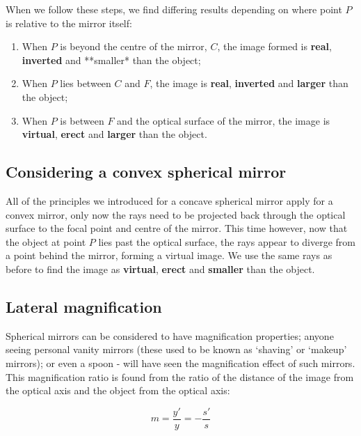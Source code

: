 \documentclass[
]{book}
\providecommand{\tightlist}{%
  \setlength{\itemsep}{0pt}\setlength{\parskip}{0pt}}
\begin{document}
When we follow these steps, we find differing results depending on where point \(P\) is relative to the mirror itself:

\begin{enumerate}
\def\labelenumi{\arabic{enumi}.}
\tightlist
\item
  When \(P\) is beyond the centre of the mirror, \(C\), the image formed is \textbf{real}, \textbf{inverted} and **smaller* than the object;
\item
  When \(P\) lies between \(C\) and \(F\), the image is \textbf{real}, \textbf{inverted} and \textbf{larger} than the object;
\item
  When \(P\) is between \(F\) and the optical surface of the mirror, the image is \textbf{virtual}, \textbf{erect} and \textbf{larger} than the object.
\end{enumerate}

\hypertarget{considering-a-convex-spherical-mirror}{%
\subsection{Considering a convex spherical mirror}\label{considering-a-convex-spherical-mirror}}

All of the principles we introduced for a concave spherical mirror apply for a convex mirror, only now the rays need to be projected back through the optical surface to the focal point and centre of the mirror. This time however, now that the object at point \(P\) lies past the optical surface, the rays appear to diverge from a point behind the mirror, forming a virtual image. We use the same rays as before to find the image as \textbf{virtual}, \textbf{erect} and \textbf{smaller} than the object.

\hypertarget{sec:ch15-lateralmagnificatin}{%
\subsection{Lateral magnification}\label{sec:ch15-lateralmagnificatin}}

Spherical mirrors can be considered to have magnification properties; anyone seeing personal vanity mirrors (these used to be known as `shaving' or `makeup' mirrors); or even a spoon - will have seen the magnification effect of such mirrors. This magnification ratio is found from the ratio of the distance of the image from the optical axis and the object from the optical axis:

\begin{equation}
m = \frac{y'}{y} = - \frac{s'}{s}
\end{equation}
\end{document}
